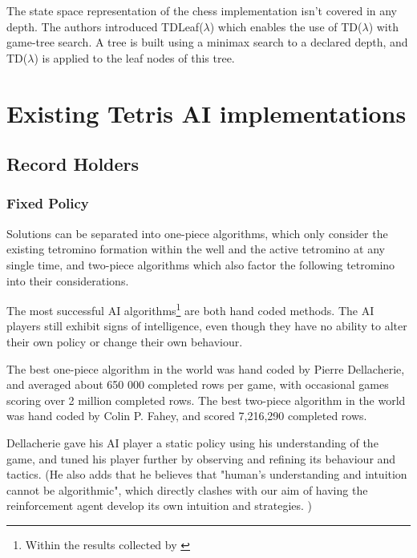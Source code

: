 \documentclass[a4paper]{article}%
\begin{document}
The state space representation of the chess implementation isn't covered in any depth. The authors introduced TDLeaf($\lambda$) which enables the use of TD($\lambda$) with game-tree search. A tree is built using a minimax search to a declared depth, and TD($\lambda$) is applied to the leaf nodes of this tree.


\section{Existing Tetris AI implementations}
\subsection{Record Holders}
\subsubsection{Fixed Policy}
Solutions can be separated into one-piece algorithms, which only consider the existing tetromino formation within the well  and the active tetromino at any single time, and two-piece algorithms which also factor the following tetromino into their considerations. 

The most successful AI algorithms\footnote{Within the results collected by \cite{tetstand}} are both hand coded methods. The AI players still exhibit signs of intelligence, even though they have no ability to alter their own policy or change their own behaviour.

 The best one-piece algorithm in the world was hand coded by Pierre Dellacherie, and averaged about 650 000 completed rows per game, with occasional games scoring over 2 million completed rows. The best two-piece algorithm in the world was hand coded by Colin P. Fahey, and scored 7,216,290 completed rows.

 Dellacherie gave his AI player a static policy using his understanding of the game, and tuned his player further by observing and refining its behaviour and tactics. (He also adds that he believes that "human's understanding and intuition cannot be algorithmic", which directly clashes with our aim of having the reinforcement agent develop its own intuition and strategies. )
 
\end{document}
